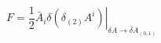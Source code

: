 \begin{equation}
F=\frac{1}{2}\bar{A}_{i}\left. \delta (\delta _{(2)}A^{i})\right| _{\delta
A\rightarrow \bar{\delta}A_{(0,1)}}  \label{a1}
\end{equation}

